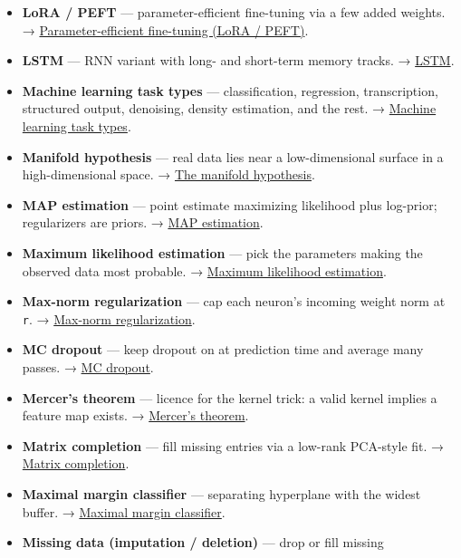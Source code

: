 \documentclass[
  10pt,
  letterpaper,
  onecolumn]{article}
\begin{document}
\begin{itemize}
  \textbf{Logits} --- un-normalized scores (log-counts) fed into
  softmax. → \protect\hyperlink{logits}{Logits}.
\item
  \textbf{LoRA / PEFT} --- parameter-efficient fine-tuning via a few
  added weights. →
  \protect\hyperlink{parameter-efficient-fine-tuning-lora-peft}{Parameter-efficient
  fine-tuning (LoRA / PEFT)}.
\item
  \textbf{LSTM} --- RNN variant with long- and short-term memory tracks.
  → \protect\hyperlink{lstm}{LSTM}.
\item
  \textbf{Machine learning task types} --- classification, regression,
  transcription, structured output, denoising, density estimation, and
  the rest. →
  \protect\hyperlink{machine-learning-task-types}{Machine learning task
  types}.
\item
  \textbf{Manifold hypothesis} --- real data lies near a
  low-dimensional surface in a high-dimensional space. →
  \protect\hyperlink{the-manifold-hypothesis}{The manifold hypothesis}.
\item
  \textbf{MAP estimation} --- point estimate maximizing likelihood plus
  log-prior; regularizers are priors. →
  \protect\hyperlink{map-estimation}{MAP estimation}.
\item
  \textbf{Maximum likelihood estimation} --- pick the parameters making
  the observed data most probable. →
  \protect\hyperlink{maximum-likelihood-estimation}{Maximum likelihood
  estimation}.
\item
  \textbf{Max-norm regularization} --- cap each neuron's incoming weight
  norm at \texttt{r}. →
  \protect\hyperlink{max-norm-regularization}{Max-norm regularization}.
\item
  \textbf{MC dropout} --- keep dropout on at prediction time and average
  many passes. → \protect\hyperlink{mc-dropout}{MC dropout}.
\item
  \textbf{Mercer's theorem} --- licence for the kernel trick: a valid
  kernel implies a feature map exists. →
  \protect\hyperlink{mercers-theorem}{Mercer's theorem}.
\item
  \textbf{Matrix completion} --- fill missing entries via a low-rank
  PCA-style fit. → \protect\hyperlink{matrix-completion}{Matrix
  completion}.
\item
  \textbf{Maximal margin classifier} --- separating hyperplane with the
  widest buffer. → \protect\hyperlink{maximal-margin-classifier}{Maximal
  margin classifier}.
\item
  \textbf{Missing data (imputation / deletion)} --- drop or fill missing

\end{itemize}
\end{document}
